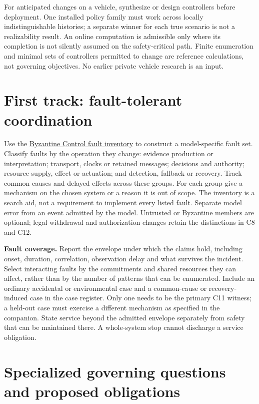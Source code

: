 \documentclass[11pt]{article}
\begin{document}
For anticipated changes on a vehicle, synthesize or design controllers before deployment. One installed policy family must work across locally indistinguishable histories; a separate winner for each true scenario is not a realizability result. An online computation is admissible only where its completion is not silently assumed on the safety-critical path. Finite enumeration and minimal sets of controllers permitted to change are reference calculations, not governing objectives. No earlier private vehicle research is an input.

\section{First track: fault-tolerant coordination}
\label{sec:faults}
Use the \href{https://github.com/eternal-november/eos-research-programmes/blob/e1348964f73704212d2d8b48d5982a5ed600a2ff/projects/byzantine-control/FAULT-COVERAGE.md}{Byzantine Control fault inventory} to construct a model-specific fault set. Classify faults by the operation they change: evidence production or interpretation; transport, clocks or retained messages; decisions and authority; resource supply, effect or actuation; and detection, fallback or recovery. Track common causes and delayed effects across these groups. For each group give a mechanism on the chosen system or a reason it is out of scope. The inventory is a search aid, not a requirement to implement every listed fault. Separate model error from an event admitted by the model. Untrusted or Byzantine members are optional; legal withdrawal and authorization changes retain the distinctions in C8 and C12.

\textbf{Fault coverage.} Report the envelope under which the claims hold, including onset, duration, correlation, observation delay and what survives the incident. Select interacting faults by the commitments and shared resources they can affect, rather than by the number of patterns that can be enumerated. Include an ordinary accidental or environmental case and a common-cause or recovery-induced case in the case register. Only one needs to be the primary C11 witness; a held-out case must exercise a different mechanism as specified in the companion. State service beyond the admitted envelope separately from safety that can be maintained there. A whole-system stop cannot discharge a service obligation.

\section{Specialized governing questions and proposed obligations}
\end{document}
